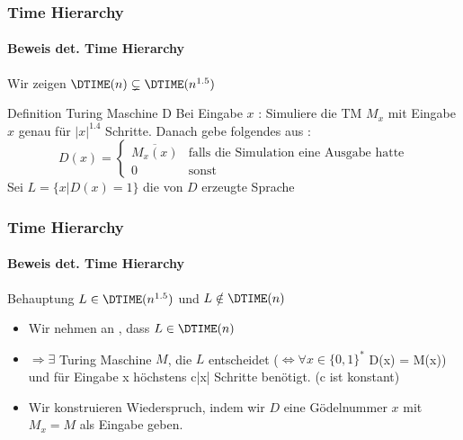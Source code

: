 \begin{frame}
	\frametitle{Time Hierarchy}
	\framesubtitle{{Beweis det. Time Hierarchy}}
	Wir zeigen $\DTIME(n) \subsetneq \DTIME(n^{1.5})$
	\bigskip
	\pause
	\begin{KITinfoblock}{Definition Turing Maschine D} 
		Bei Eingabe $x$ : Simuliere die TM $M_x$ mit Eingabe $x$ genau für $|x|^{1.4}$
		 						Schritte. Danach gebe folgendes aus :
		\begin{equation*}
		D(x) = 
		\begin{cases}
			\overline{M_x(x)} & \text{falls die Simulation eine Ausgabe hatte} \\
			0 & \text{sonst}
			
		\end{cases}
		\end{equation*}			
		\bigskip
		Sei $L =  \lbrace x \vert D(x) = 1  \rbrace$ die von $D$ erzeugte Sprache
	\end{KITinfoblock}
\end{frame}

\begin{frame}
	\frametitle{Time Hierarchy}
	\framesubtitle{Beweis det. Time Hierarchy}
	\begin{KITblock}{Behauptung}
		$L \in \DTIME(n^{1.5})$ und $L \notin \DTIME(n)$
	\end{KITblock}
	\pause
	\begin{itemize}[<+->]
		\item Wir nehmen an , dass $L \in \DTIME(n)$
		\item $\Rightarrow \exists$ Turing Maschine $M$, die $L$ entscheidet \newline
		($\Leftrightarrow \forall x \in {\lbrace 0,1 \rbrace }^{*}$ D(x) = M(x)) und
		für Eingabe x höchstens c|x| Schritte benötigt. (c ist konstant)
		\item Wir konstruieren Wiederspruch, indem wir $D$ eine Gödelnummer $x$ mit
			$M_x = M$ als Eingabe geben.
	\end{itemize}
\end{frame}

